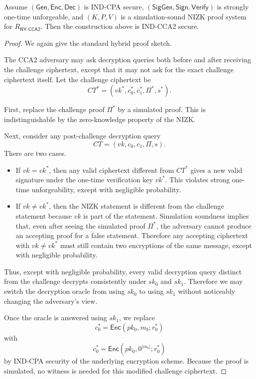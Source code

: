 \begin{theorem}\label{thm:naor-yung-cca2}
Assume $(\mathsf{Gen},\mathsf{Enc},\mathsf{Dec})$ is IND-CPA secure,
$(\mathsf{SigGen},\mathsf{Sign},\mathsf{Verify})$ is strongly one-time
unforgeable, and $(K,P,V)$ is a simulation-sound NIZK proof system for
$R_{\mathsf{NY\text{-}CCA2}}$. Then the construction above is IND-CCA2 secure.
\end{theorem}

\begin{proof}
We again give the standard hybrid proof sketch.

The CCA2 adversary may ask decryption queries both before and after receiving the
challenge ciphertext, except that it may not ask for the exact challenge
ciphertext itself. Let the challenge ciphertext be
\[
CT^*=(vk^*,c_0^*,c_1^*,\Pi^*,s^*).
\]

First, replace the challenge proof $\Pi^*$ by a simulated proof. This is
indistinguishable by the zero-knowledge property of the NIZK.

Next, consider any post-challenge decryption query
\[
CT=(vk,c_0,c_1,\Pi,s).
\]
There are two cases.

\begin{itemize}
    \item If $vk=vk^*$, then any valid ciphertext different from $CT^*$ gives a
    new valid signature under the one-time verification key $vk^*$. This violates
    strong one-time unforgeability, except with negligible probability.

    \item If $vk\neq vk^*$, then the NIZK statement is different from the
    challenge statement because $vk$ is part of the statement. Simulation
    soundness implies that, even after seeing the simulated proof $\Pi^*$, the
    adversary cannot produce an accepting proof for a false statement. Therefore
    any accepting ciphertext with $vk\neq vk^*$ must still contain two
    encryptions of the same message, except with negligible probability.
\end{itemize}

Thus, except with negligible probability, every valid decryption query distinct
from the challenge decrypts consistently under $sk_0$ and $sk_1$. Therefore we
may switch the decryption oracle from using $sk_0$ to using $sk_1$ without
noticeably changing the adversary's view.

Once the oracle is answered using $sk_1$, we replace
\[
c_0^*=\mathsf{Enc}(pk_0,m_b;r_0^*)
\]
with
\[
c_0^*=\mathsf{Enc}(pk_0,0^{|m_b|};r_0^*)
\]
by IND-CPA security of the underlying encryption scheme. Because the proof is
simulated, no witness is needed for this modified challenge ciphertext.


\end{proof}

